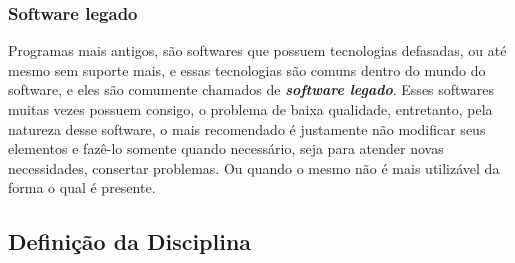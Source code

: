 \documentclass[12pt, a4paper]{paper}
\begin{document}
\subsubsection{Software legado}
Programas mais antigos, são softwares que possuem tecnologias defasadas, ou até mesmo 
sem suporte mais, e essas tecnologias são comuns dentro do mundo do software, e eles são 
comumente chamados de \textbf{\textit{software legado}}. Esses softwares muitas vezes 
possuem consigo, o problema de baixa qualidade, entretanto, pela natureza desse 
software, o mais recomendado é justamente não modificar seus elementos e fazê-lo 
somente quando necessário, seja para atender novas necessidades, consertar problemas. 
Ou quando o mesmo não é mais utilizável da forma o qual é presente.


\subsection{Definição da Disciplina} %
\label{sub:Definição da Disciplina}







\end{document}
